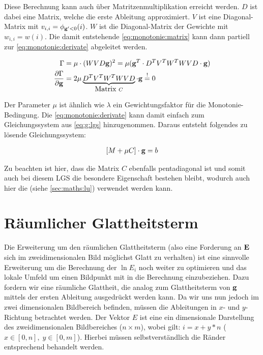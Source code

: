 Diese Berechnung kann auch über Matritzenmultiplikation erreicht werden. $D$ ist dabei eine Matrix, welche die erste Ableitung approximiert. $V$ ist eine Diagonal-Matrix mit $v_{i,i} = \phi_{\mathbf g'<0}(i)$. $W$ ist die Diagonal-Matrix der Gewichte mit $w_{i,i} = w(i)$. Die damit entstehende \autoref{eq:monotonie:matrix} kann dann partiell zur \autoref{eq:monotonie:derivate} abgeleitet werden.

\begin{align}
\label{eq:monotonie:matrix}
\Gamma &= \mu  \cdot (W V  D \mathbf g)^2 = \mu (\mathbf g^T \cdot D^T V^T W^T W V D \cdot \mathbf g)\\
\label{eq:monotonie:derivate}
\frac{\partial \Gamma}{\partial \mathbf g} &= 2 \mu \underbrace{D^T V^T W^T W V D}_{\mbox{Matrix }C}\cdot \mathbf g \overset{!}{=} 0
\end{align}


Der Parameter $\mu$ ist ähnlich wie $\lambda$ ein Gewichtungsfaktor für die Monotonie-Bedingung. Die \autoref{eq:monotonie:derivate} kann damit einfach zum Gleichungssystem aus \ref{eq:g:lgs} hinzugenommen. Daraus entsteht folgendes zu lösende Gleichungssystem:

\begin{align}
\label{eq:g:monotonie}
[M + \mu C] \cdot \mathbf g = b
\end{align}

Zu beachten ist hier, dass die Matrix $C$ ebenfalls pentadiagonal ist und somit auch bei diesem LGS die besondere Eigenschaft bestehen bleibt, wodurch auch hier die  (siehe \autoref{sec:maths:lu}) verwendet werden kann.


\section{Räumlicher Glattheitsterm}
\label{sec:raeumlich}
Die Erweiterung um den räumlichen Glattheitsterm (also eine Forderung an $\mathbf E$ sich im zweidimensionalen Bild möglichst Glatt zu verhalten) ist eine sinnvolle Erweiterung um die Berechnung der $\ln E_i$ noch weiter zu optimieren und das lokale Umfeld um einen Bildpunkt mit in die Berechnung einzubeziehen. Dazu fordern wir eine räumliche Glattheit, die analog zum Glattheitsterm von $\mathbf g$ mittels der ersten Ableitung ausgedrückt werden kann. Da wir uns nun jedoch im zwei dimensionalen Bildbereich befinden, müssen die Ableitungen in $x$- und $y$-Richtung betrachtet werden. Der Vektor $E$ ist eine ein dimensionale Darstellung des zweidimensionalen Bildbereiches ($n \times m$), wobei gilt: $i = x+y*n$ ($x \in [0,n], \; y \in [0,m]$). 
Hierbei müssen selbstverständlich die Ränder entsprechend behandelt werden.

